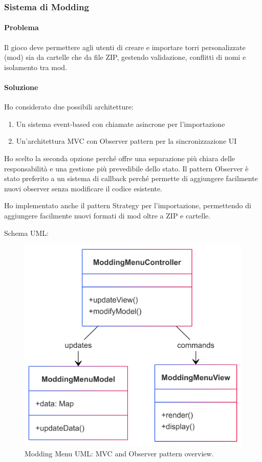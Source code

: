 \documentclass[a4paper,12pt]{report}
\begin{document}
\subsubsection{Sistema di Modding}

\paragraph{Problema} Il gioco deve permettere agli utenti di creare e importare torri personalizzate (mod) sia da cartelle che da file ZIP, gestendo validazione, conflitti di nomi e isolamento tra mod.

\paragraph{Soluzione} Ho considerato due possibili architetture:

\begin{enumerate}
    \item Un sistema event-based con chiamate asincrone per l'importazione
    \item Un'architettura MVC con Observer pattern per la sincronizzazione UI
\end{enumerate}
Ho scelto la seconda opzione perché offre una separazione più chiara delle responsabilità e una gestione più prevedibile dello stato. Il pattern Observer è stato preferito a un sistema di callback perché permette di aggiungere facilmente nuovi observer senza modificare il codice esistente.

Ho implementato anche il pattern Strategy per l'importazione, permettendo di aggiungere facilmente nuovi formati di mod oltre a ZIP e cartelle.

Schema UML:
\begin{figure}[H]
	\centering
	\includegraphics[scale=0.08]{img/ModdingMenuUML.png}
	\caption{Modding Menu UML: MVC and Observer pattern overview.}
\end{figure}
\end{document}
